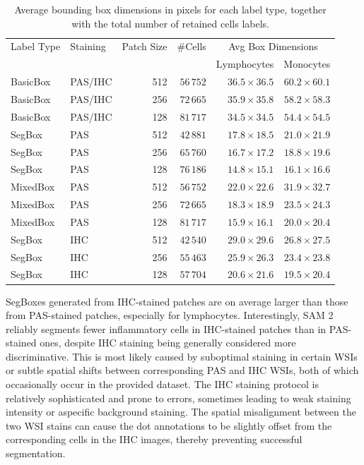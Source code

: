 \begin{table}
    \centering
    \begin{tabular}{llrrrr}
        \toprule
        Label Type & Staining & Patch Size & \#Cells & \multicolumn{2}{c}{Avg Box Dimensions} \\
        & & & & Lymphocytes & Monocytes \\
        \midrule
        BasicBox & PAS/IHC & 512 & $56\,752$ & $36.5 \times 36.5$ & $60.2 \times 60.1$ \\
        BasicBox & PAS/IHC & 256 & $72\,665$ & $35.9 \times 35.8$ & $58.2 \times 58.3$ \\
        BasicBox & PAS/IHC & 128 & $81\,717$ & $34.5 \times 34.5$ & $54.4 \times 54.5$ \\
        \midrule
        SegBox & PAS & 512 & $42\,881$ & $17.8 \times 18.5$ & $21.0 \times 21.9$ \\
        SegBox & PAS & 256 & $65\,760$ & $16.7 \times 17.2$ & $18.8 \times 19.6$ \\
        SegBox & PAS & 128 & $76\,186$ & $14.8 \times 15.1$ & $16.1 \times 16.6$ \\
        \midrule
        MixedBox & PAS & 512 & $56\,752$ & $22.0 \times 22.6$ & $31.9 \times 32.7$ \\
        MixedBox & PAS & 256 & $72\,665$ & $18.3 \times 18.9$ & $23.5 \times 24.3$ \\
        MixedBox & PAS & 128 & $81\,717$ & $15.9 \times 16.1$ & $20.0 \times 20.4$ \\
        \midrule
        SegBox & IHC & 512 & $42\,540$ & $29.0 \times 29.6$ & $26.8 \times 27.5$ \\
        SegBox & IHC & 256 & $55\,463$ & $25.9 \times 26.3$ & $23.4 \times 23.8$ \\
        SegBox & IHC & 128 & $57\,704$ & $20.6 \times 21.6$ & $19.5 \times 20.4$ \\
        \bottomrule
    \end{tabular}
    \caption{Average bounding box dimensions in pixels for each label type, together with the total number of retained cells labels.}
    \label{tab:boxes}
\end{table}

SegBoxes generated from IHC-stained patches are on average larger than those from PAS-stained patches, especially for lymphocytes. Interestingly, SAM 2 reliably segments fewer inflammatory cells in IHC-stained patches than in PAS-stained ones, despite IHC staining being generally considered more discriminative. This is most likely caused by suboptimal staining in certain WSIs or subtle spatial shifts between corresponding PAS and IHC WSIs, both of which occasionally occur in the provided dataset. The IHC staining protocol is relatively sophisticated and prone to errors, sometimes leading to weak staining intensity or aspecific background staining. The spatial misalignment between the two WSI stains can cause the dot annotations to be slightly offset from the corresponding cells in the IHC images, thereby preventing successful segmentation.


